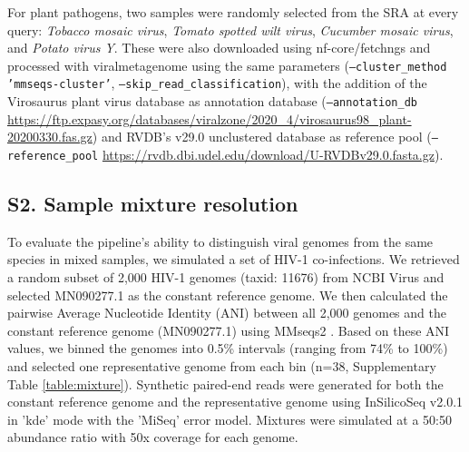 For plant pathogens, two samples were randomly selected from the SRA at every query: \textit{Tobacco mosaic virus}, \textit{Tomato spotted wilt virus}, \textit{Cucumber mosaic virus}, and \textit{Potato virus Y}. These were also downloaded using nf-core/fetchngs and processed with viralmetagenome using the same parameters (\texttt{--cluster\_method 'mmseqs-cluster'}, \texttt{--skip\_read\_classification}), with the addition of the Virosaurus plant virus database as annotation database (\texttt{--annotation\_db} \url{https://ftp.expasy.org/databases/viralzone/2020_4/virosaurus98_plant-20200330.fas.gz}) and RVDB's v29.0 unclustered database as reference pool (\texttt{--reference\_pool} \url{https://rvdb.dbi.udel.edu/download/U-RVDBv29.0.fasta.gz}).

\subsection*{S2. Sample mixture resolution}
To evaluate the pipeline’s ability to distinguish viral genomes from the same species in mixed samples, we simulated a set of HIV-1 co-infections. We retrieved a random subset of 2,000 HIV-1 genomes (taxid: 11676) from NCBI Virus and selected MN090277.1 as the constant reference genome. We then calculated the pairwise Average Nucleotide Identity (ANI) between all 2,000 genomes and the constant reference genome (MN090277.1) using MMseqs2 \citep{Steinegger2017-ci}. Based on these ANI values, we binned the genomes into 0.5\% intervals (ranging from 74\% to 100\%) and selected one representative genome from each bin (n=38, Supplementary Table \ref{table:mixture}). Synthetic paired-end reads were generated for both the constant reference genome and the representative genome using InSilicoSeq v2.0.1\citep{Gourle2019-ox} in 'kde' mode with the 'MiSeq' error model. Mixtures were simulated at a 50:50 abundance ratio with 50x coverage for each genome.


